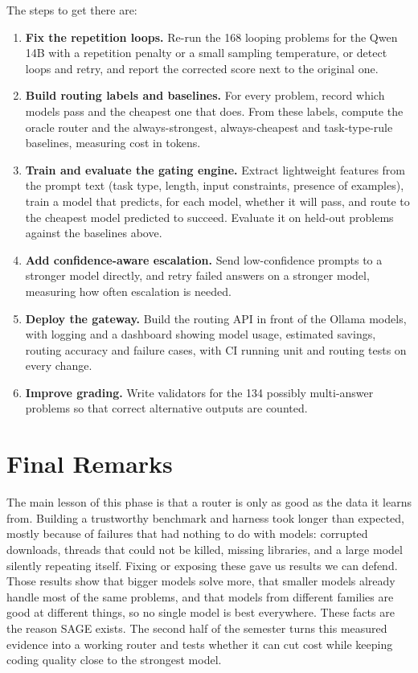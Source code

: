 The steps to get there are:
\begin{enumerate}[leftmargin=*]
  \item \textbf{Fix the repetition loops.} Re-run the 168 looping problems for the Qwen 14B with a repetition penalty or a small sampling temperature, or detect loops and retry, and report the corrected score next to the original one.
  \item \textbf{Build routing labels and baselines.} For every problem, record which models pass and the cheapest one that does. From these labels, compute the oracle router and the always-strongest, always-cheapest and task-type-rule baselines, measuring cost in tokens.
  \item \textbf{Train and evaluate the gating engine.} Extract lightweight features from the prompt text (task type, length, input constraints, presence of examples), train a model that predicts, for each model, whether it will pass, and route to the cheapest model predicted to succeed. Evaluate it on held-out problems against the baselines above.
  \item \textbf{Add confidence-aware escalation.} Send low-confidence prompts to a stronger model directly, and retry failed answers on a stronger model, measuring how often escalation is needed.
  \item \textbf{Deploy the gateway.} Build the routing API in front of the Ollama models, with logging and a dashboard showing model usage, estimated savings, routing accuracy and failure cases, with CI running unit and routing tests on every change.
  \item \textbf{Improve grading.} Write validators for the 134 possibly multi-answer problems so that correct alternative outputs are counted.
\end{enumerate}

\section{Final Remarks}

The main lesson of this phase is that a router is only as good as the data it learns from. Building a trustworthy benchmark and harness took longer than expected, mostly because of failures that had nothing to do with models: corrupted downloads, threads that could not be killed, missing libraries, and a large model silently repeating itself. Fixing or exposing these gave us results we can defend. Those results show that bigger models solve more, that smaller models already handle most of the same problems, and that models from different families are good at different things, so no single model is best everywhere. These facts are the reason SAGE exists. The second half of the semester turns this measured evidence into a working router and tests whether it can cut cost while keeping coding quality close to the strongest model.

\clearpage
{}
{}




